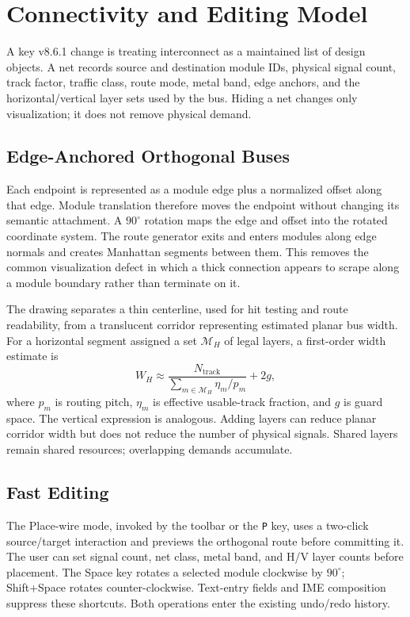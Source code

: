 \section{Connectivity and Editing Model}
A key v8.6.1 change is treating interconnect as a maintained list of design objects. A net records source and destination module IDs, physical signal count, track factor, traffic class, route mode, metal band, edge anchors, and the horizontal/vertical layer sets used by the bus. Hiding a net changes only visualization; it does not remove physical demand.

\subsection{Edge-Anchored Orthogonal Buses}
Each endpoint is represented as a module edge plus a normalized offset along that edge. Module translation therefore moves the endpoint without changing its semantic attachment. A $90^\circ$ rotation maps the edge and offset into the rotated coordinate system. The route generator exits and enters modules along edge normals and creates Manhattan segments between them. This removes the common visualization defect in which a thick connection appears to scrape along a module boundary rather than terminate on it.

The drawing separates a thin centerline, used for hit testing and route readability, from a translucent corridor representing estimated planar bus width. For a horizontal segment assigned a set $\mathcal{M}_H$ of legal layers, a first-order width estimate is
\begin{equation}
W_H \approx \frac{N_{\mathrm{track}}}{\sum_{m\in\mathcal{M}_H}\eta_m/p_m}+2g,
\end{equation}
where $p_m$ is routing pitch, $\eta_m$ is effective usable-track fraction, and $g$ is guard space. The vertical expression is analogous. Adding layers can reduce planar corridor width but does not reduce the number of physical signals. Shared layers remain shared resources; overlapping demands accumulate.

\subsection{Fast Editing}
The Place-wire mode, invoked by the toolbar or the \texttt{P} key, uses a two-click source/target interaction and previews the orthogonal route before committing it. The user can set signal count, net class, metal band, and H/V layer counts before placement. The Space key rotates a selected module clockwise by $90^\circ$; Shift+Space rotates counter-clockwise. Text-entry fields and IME composition suppress these shortcuts. Both operations enter the existing undo/redo history.

